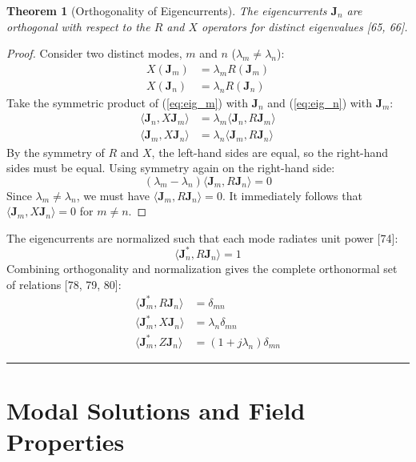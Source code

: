 \documentclass[11pt]{article}
\newcommand{\vect}[1]{\mathbf{#1}}
\newcommand{\sprod}[2]{\langle #1, #2 \rangle}
\newtheorem{theorem}{Theorem}[section]
\theoremstyle{definition}
\begin{document}
\begin{theorem}[Orthogonality of Eigencurrents]
The eigencurrents $\vect{J}_n$ are orthogonal with respect to the $R$ and $X$ operators for distinct eigenvalues [65, 66].
\end{theorem}
\begin{proof}
Consider two distinct modes, $m$ and $n$ ($\lambda_m \neq \lambda_n$):
\begin{align}
X(\vect{J}_m) &= \lambda_m R(\vect{J}_m) \label{eq:eig_m} \\
X(\vect{J}_n) &= \lambda_n R(\vect{J}_n) \label{eq:eig_n}
\end{align}
Take the symmetric product of (\ref{eq:eig_m}) with $\vect{J}_n$ and (\ref{eq:eig_n}) with $\vect{J}_m$:
\begin{align}
\sprod{\vect{J}_n}{X\vect{J}_m} &= \lambda_m \sprod{\vect{J}_n}{R\vect{J}_m} \\
\sprod{\vect{J}_m}{X\vect{J}_n} &= \lambda_n \sprod{\vect{J}_m}{R\vect{J}_n}
\end{align}
By the symmetry of $R$ and $X$, the left-hand sides are equal, so the right-hand sides must be equal. Using symmetry again on the right-hand side:
\[ (\lambda_m - \lambda_n) \sprod{\vect{J}_m}{R\vect{J}_n} = 0 \]
Since $\lambda_m \neq \lambda_n$, we must have $\sprod{\vect{J}_m}{R\vect{J}_n} = 0$. It immediately follows that $\sprod{\vect{J}_m}{X\vect{J}_n} = 0$ for $m \neq n$.
\end{proof}
The eigencurrents are normalized such that each mode radiates unit power [74]:
\begin{equation}
\sprod{\vect{J}_n^*}{R\vect{J}_n} = 1
\end{equation}
Combining orthogonality and normalization gives the complete orthonormal set of relations [78, 79, 80]:
\begin{align}
\sprod{\vect{J}_m^*}{R\vect{J}_n} &= \delta_{mn} \\
\sprod{\vect{J}_m^*}{X\vect{J}_n} &= \lambda_n \delta_{mn} \\
\sprod{\vect{J}_m^*}{Z\vect{J}_n} &= (1+j\lambda_n) \delta_{mn}
\end{align}

\hrule\vspace{1.5em}

\section{Modal Solutions and Field Properties}
\end{document}
